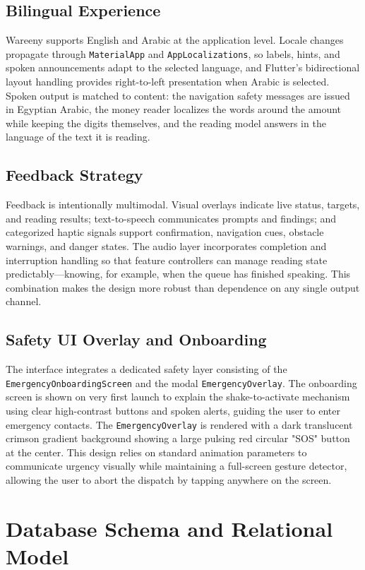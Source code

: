 \documentclass[12pt,a4paper]{report}
\begin{document}
\subsection{Bilingual Experience}
Wareeny supports English and Arabic at the application level. Locale changes propagate through \texttt{MaterialApp} and \texttt{AppLocalizations}, so labels, hints, and spoken announcements adapt to the selected language, and Flutter's bidirectional layout handling provides right-to-left presentation when Arabic is selected. Spoken output is matched to content: the navigation safety messages are issued in Egyptian Arabic, the money reader localizes the words around the amount while keeping the digits themselves, and the reading model answers in the language of the text it is reading.

\subsection{Feedback Strategy}
Feedback is intentionally multimodal. Visual overlays indicate live status, targets, and reading results; text-to-speech communicates prompts and findings; and categorized haptic signals support confirmation, navigation cues, obstacle warnings, and danger states. The audio layer incorporates completion and interruption handling so that feature controllers can manage reading state predictably---knowing, for example, when the queue has finished speaking. This combination makes the design more robust than dependence on any single output channel.

\subsection{Safety UI Overlay and Onboarding}
The interface integrates a dedicated safety layer consisting of the \texttt{EmergencyOnboardingScreen} and the modal \texttt{EmergencyOverlay}. The onboarding screen is shown on very first launch to explain the shake-to-activate mechanism using clear high-contrast buttons and spoken alerts, guiding the user to enter emergency contacts. The \texttt{EmergencyOverlay} is rendered with a dark translucent crimson gradient background showing a large pulsing red circular "SOS" button at the center. This design relies on standard animation parameters to communicate urgency visually while maintaining a full-screen gesture detector, allowing the user to abort the dispatch by tapping anywhere on the screen.

\section{Database Schema and Relational Model}
\end{document}
